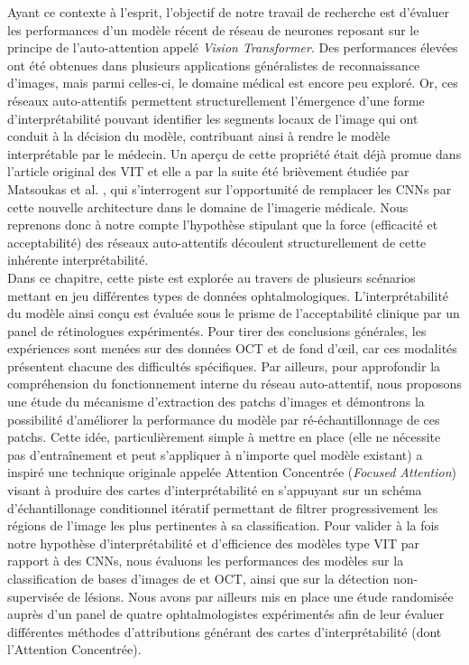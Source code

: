 Ayant ce contexte à l'esprit, l'objectif de notre travail de recherche est d'évaluer les performances d'un modèle récent de réseau de neurones reposant sur le principe de l'auto-attention appelé \textit{Vision Transformer}. Des performances élevées ont été obtenues dans plusieurs applications généralistes de reconnaissance d'images, mais parmi celles-ci, le domaine médical est encore peu exploré. Or, ces réseaux auto-attentifs permettent structurellement l'émergence d'une forme d'interprétabilité pouvant identifier les segments locaux de l'image qui ont conduit à la décision du modèle, contribuant ainsi à rendre le modèle interprétable par le médecin. Un aperçu de cette propriété était déjà promue dans l'article original des \ac{VIT}\cite{dosovitskiyImageWorth16x162020} et elle a par la suite été brièvement étudiée par Matsoukas et al. \cite{matsoukasItTimeReplace2021}, qui s'interrogent sur l'opportunité de remplacer les \ac{CNN}s par cette nouvelle architecture dans le domaine de l'imagerie médicale. Nous reprenons donc à notre compte l'hypothèse stipulant que la force (efficacité et acceptabilité) des réseaux auto-attentifs découlent structurellement de cette inhérente interprétabilité. \\
Dans ce chapitre, cette piste est explorée au travers de plusieurs scénarios mettant en jeu différentes types de données ophtalmologiques. L'interprétabilité du modèle ainsi conçu est évaluée sous le prisme de l'acceptabilité clinique par un panel de rétinologues expérimentés.
Pour tirer des conclusions générales, les expériences sont menées sur des données \ac{OCT} et de fond d'\oe il, car ces modalités présentent chacune des difficultés spécifiques. 
Par ailleurs, pour approfondir la compréhension du fonctionnement interne du réseau auto-attentif, nous proposons une étude du mécanisme d'extraction des patchs d'images et démontrons la possibilité d'améliorer la performance du modèle par ré-échantillonnage de ces patchs. Cette idée, particulièrement simple à mettre en place (elle ne nécessite pas d'entraînement et peut s'appliquer à n'importe quel modèle existant) a inspiré une technique originale appelée \og Attention Concentrée \fg (\textit{Focused Attention}) visant à produire des cartes d'interprétabilité en s'appuyant sur un schéma d'échantillonage conditionnel itératif permettant de filtrer progressivement les régions de l'image les plus pertinentes à sa classification. Pour valider à la fois notre hypothèse d'interprétabilité et d'efficience des modèles type \ac{VIT} par rapport à des \ac{CNN}s, nous évaluons les performances des modèles sur la classification de bases d'images de \fundus{} et \ac{OCT}, ainsi que sur la détection non-supervisée de lésions. Nous avons par ailleurs mis en place une étude randomisée auprès d'un panel de quatre ophtalmologistes expérimentés afin de leur évaluer différentes méthodes d'attributions générant des cartes d'interprétabilité (dont l'Attention Concentrée).
